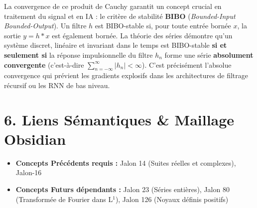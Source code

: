 \documentclass[12pt,a4paper]{report}
\begin{document}
La convergence de ce produit de Cauchy garantit un concept crucial en traitement du signal et en IA : le critère de stabilité \textbf{BIBO} (\textit{Bounded-Input Bounded-Output}). Un filtre $h$ est BIBO-stable si, pour toute entrée bornée $x$, la sortie $y = h \ast x$ est également bornée. La théorie des séries démontre qu'un système discret, linéaire et invariant dans le temps est BIBO-stable \textbf{si et seulement si} la réponse impulsionnelle du filtre $h_n$ forme une série \textbf{absolument convergente} (c'est-à-dire $\sum_{n=-\infty}^\infty |h_n| < \infty$).
C'est précisément l'absolue convergence qui prévient les gradients explosifs dans les architectures de filtrage récursif ou les RNN de bas niveau.

\section{6. Liens Sémantiques \& Maillage Obsidian}
\begin{itemize}
\item \textbf{Concepts Précédents requis :} Jalon 14 (Suites réelles et complexes), Jalon-16
\item \textbf{Concepts Futurs dépendants :} Jalon 23 (Séries entières), Jalon 80 (Transformée de Fourier dans L$^1$), Jalon 126 (Noyaux définis positifs)
\end{itemize}
\end{document}
